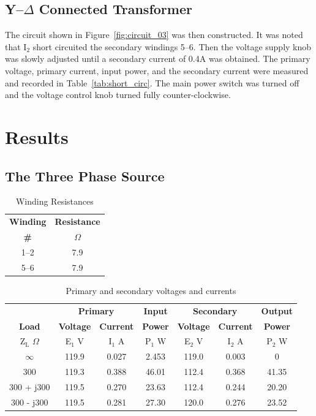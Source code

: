 \documentclass{article}
\begin{document}
\subsection{Y--$\Delta$ Connected Transformer}

\label{part3} The circuit shown in Figure~\ref{fig:circuit_03} was then
constructed. It was noted that I$_2$ short circuited the secondary windings
5--6. Then the voltage supply knob was slowly adjusted until a secondary
current of 0.4A was obtained. The primary voltage, primary current, input
power, and the secondary current were measured and recorded in
Table~\ref{tab:short_circ}.  The main power switch was turned off and the
voltage control knob turned fully counter-clockwise.

\section{Results}
\subsection{The Three Phase Source}
\begin{table}[H]
  \centering
  \begin{tabular}{*{2}{c}}
    \textbf{Winding} & \textbf{Resistance} \\
    \textbf{\#} & $\Omega$ \\
    \hline
    1--2 &  7.9 \\
    5--6 &  7.9 \\
  \end{tabular}
  \caption{Winding Resistances}
  \label{tab:wind_res}
\end{table}

\begin{table}[H]
  \centering
  \begin{tabular}{*{7}{c}}
    & \multicolumn{2}{c}{\textbf{Primary}} & \textbf{Input}
    & \multicolumn{2}{c}{\textbf{Secondary}} & \textbf{Output} \\
    \textbf{Load} & \textbf{Voltage} & \textbf{Current} & \textbf{Power}
    & \textbf{Voltage} & \textbf{Current} & \textbf{Power} \\
    Z$_\text{L}$ $\Omega$ & E$_1$ V & I$_1$ A & P$_1$ W
    & E$_2$ V & I$_2$ A &
    P$_2$ W \\
    \hline
    $\infty$   & 119.9 & 0.027 & 2.453 & 119.0 & 0.003 & 0 \\
    300        & 119.3 & 0.388 & 46.01 & 112.4 & 0.368 & 41.35 \\
    300 + j300 & 119.5 & 0.270 & 23.63 & 112.4 & 0.244 & 20.20 \\
    300 - j300 & 119.5 & 0.281 & 27.30 & 120.0 & 0.276 & 23.52 \\
  \end{tabular}
  \caption{Primary and secondary voltages and currents}
  \label{tab:volt_rat}
\end{table}
\end{document}
